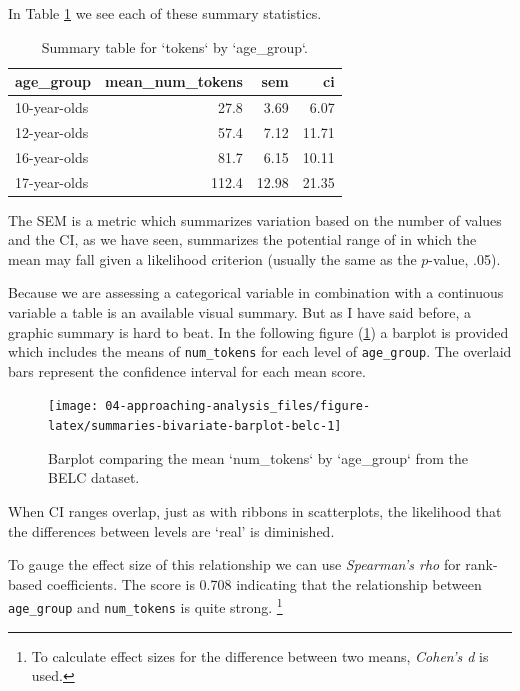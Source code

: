 \documentclass[
]{article}
\begin{document}
In Table \ref{tab:summarize-bivariate-cont-cat-table} we see each of these summary statistics.

\begin{table}

\caption{\label{tab:summarize-bivariate-cont-cat-table}Summary table for `tokens` by `age_group`.}
\centering
\begin{tabular}[t]{lrrr}
\toprule
age\_group & mean\_num\_tokens & sem & ci\\
\midrule
10-year-olds & 27.8 & 3.69 & 6.07\\
12-year-olds & 57.4 & 7.12 & 11.71\\
16-year-olds & 81.7 & 6.15 & 10.11\\
17-year-olds & 112.4 & 12.98 & 21.35\\
\bottomrule
\end{tabular}
\end{table}

The SEM is a metric which summarizes variation based on the number of values and the CI, as we have seen, summarizes the potential range of in which the mean may fall given a likelihood criterion (usually the same as the \(p\)-value, .05).

Because we are assessing a categorical variable in combination with a continuous variable a table is an available visual summary. But as I have said before, a graphic summary is hard to beat. In the following figure (\ref{fig:summaries-bivariate-barplot-belc}) a barplot is provided which includes the means of \texttt{num\_tokens} for each level of \texttt{age\_group}. The overlaid bars represent the confidence interval for each mean score.

\begin{figure}

{\centering \texttt{[image: 04-approaching-analysis\_files/figure-latex/summaries-bivariate-barplot-belc-1]} 

}

\caption{Barplot comparing the mean `num\_tokens` by `age\_group` from the BELC dataset.}\label{fig:summaries-bivariate-barplot-belc}
\end{figure}

When CI ranges overlap, just as with ribbons in scatterplots, the likelihood that the differences between levels are `real' is diminished.

To gauge the effect size of this relationship we can use \emph{Spearman's rho} for rank-based coefficients. The score is 0.708 indicating that the relationship between \texttt{age\_group} and \texttt{num\_tokens} is quite strong. \footnote{To calculate effect sizes for the difference between two means, \emph{Cohen's d} is used.}
\end{document}
